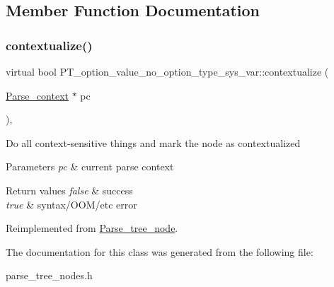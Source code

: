 \subsection{Member Function Documentation}
\mbox{\label{classPT__option__value__no__option__type__sys__var_abd287cc5111f786a62032da4ff2b518f}} 
\subsubsection{\texorpdfstring{contextualize()}{contextualize()}}
{\footnotesize\ttfamily virtual bool P\+T\+\_\+option\+\_\+value\+\_\+no\+\_\+option\+\_\+type\+\_\+sys\+\_\+var\+::contextualize (\begin{DoxyParamCaption}\item[{\mbox{\hyperlink{structParse__context}{Parse\+\_\+context}} $\ast$}]{pc }\end{DoxyParamCaption})\hspace{0.3cm}{\ttfamily [inline]}, {\ttfamily [virtual]}}

Do all context-\/sensitive things and mark the node as contextualized


\begin{DoxyParams}{Parameters}
{\em pc} & current parse context\\
\hline
\end{DoxyParams}

\begin{DoxyRetVals}{Return values}
{\em false} & success \\
\hline
{\em true} & syntax/\+O\+O\+M/etc error \\
\hline
\end{DoxyRetVals}


Reimplemented from \mbox{\hyperlink{classParse__tree__node_a22d93524a537d0df652d7efa144f23da}{Parse\+\_\+tree\+\_\+node}}.



The documentation for this class was generated from the following file\+:\begin{DoxyCompactItemize}
\item 
parse\+\_\+tree\+\_\+nodes.\+h\end{DoxyCompactItemize}
